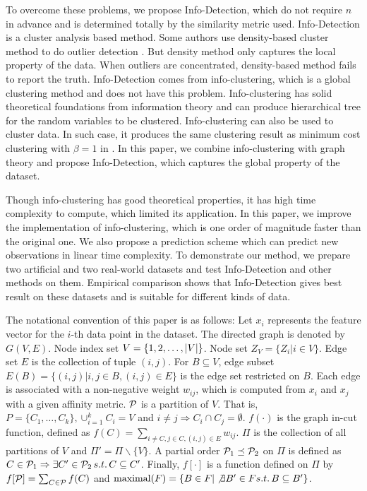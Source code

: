 \documentclass[runningheads]{llncs}
\begin{document}
To overcome these problems, we propose Info-Detection, which do not require $n$ in advance and is determined totally by the similarity metric used.  
Info-Detection is a cluster analysis based method. Some authors use density-based cluster method to do outlier detection \cite{Campello}. But density method only captures the local property of the data. When outliers are concentrated, density-based method fails to report the truth. Info-Detection comes from info-clustering, which is a global clustering method \cite{RN1} and does not have this problem. Info-clustering has solid theoretical foundations from information theory and can produce hierarchical tree for the random variables to be clustered. Info-clustering can also be used to cluster data. In such case, it produces the same clustering result as minimum cost clustering with $\beta = 1$ in \cite{RN7}. In this paper, we combine info-clustering with graph theory and propose Info-Detection, which captures the global property of the dataset.  

Though info-clustering has good theoretical properties, it has high time complexity to compute, which limited its application. In this paper, we improve the implementation of info-clustering, which is one order of magnitude faster than the original one. We also propose a prediction scheme which can predict new observations in linear time complexity. To demonstrate our method, we prepare two artificial and two real-world datasets and test Info-Detection and other methods on them. Empirical comparison shows that Info-Detection gives best result on these datasets and is suitable for different kinds of data.

The notational convention of this paper is as follows: Let $x_i$ represents the feature vector for the $i$-th data point in the dataset. The directed graph is denoted by $G(V, E)$. Node index set $V=\{1, 2,\dots, \abs{V}\}$. Node set $Z_V=\{Z_i | i \in V\}$. Edge set $E$ is the collection of tuple $(i,j)$. For $B\subseteq V$, edge subset $E(B) = \{(i,j)| i, j \in B,(i,j)\in E\}$ is the edge set restricted on $B$. Each edge is associated with a non-negative weight $w_{ij}$, which is computed from $x_i$ and $x_j$ with a given affinity metric. $\P$ is a partition of $V$. That is, $P=\{C_1, \dots, C_k\}, \cup_{i=1}^k C_i=V$ and $i\neq j \Rightarrow C_i \cap C_j =\emptyset $. $f(\cdot)$ is the graph in-cut function, defined as $f(C)=\sum_{i \neq C, j\in C, (i,j) \in E} w_{ij}$. $\Pi$ is the collection of all partitions of $V$ and $\Pi'=\Pi\backslash\{V\}$. A partial order $ \P_1 \preceq \P_2$ on $\Pi$ is defined as
$C \in \P_1 \Rightarrow \exists C' \in \P_2 \, s.t. \, C \subseteq C'$.
Finally, $f[\cdot]$ is a function defined on $\Pi$ by $f[\P]=\sum_{C\in \P}f(C)$ and $\textrm{maximal} (F)=\{B\in F | \not\exists B' \in F s.t.\, B \subseteq B'\}$.
\end{document}
